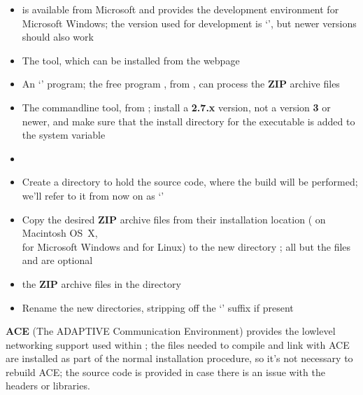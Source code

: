 \begin{itemize}
\item{} is available from Microsoft and provides the 
development environment for Microsoft Windows; the version used for development is
`', but newer versions should also work
\item\exSp{}The  tool, which can be installed from the web\longDash{}page
\item\exSp{}An `' program; the free program , from
, can process the \textbf{ZIP} archive files
\item\exSp{}The  command\longDash{}line tool, from
; install a \textbf{2.7.x}
version, not a version \textbf{3} or newer, and make sure that the install directory for
the executable is added to the system  variable
\end{itemize}
\tertiaryEnd
{}
\begin{itemize}
\item\TBD
\end{itemize}
\tertiaryEnd
\secondaryEnd
{}
\begin{itemize}
\item Create a directory to hold the source code, where the build will be performed; we'll
refer to it from now on as `'
\item\exSp{}Copy the desired \textbf{ZIP} archive files from their installation location
( on Macintosh OS~X,\\
 for
Microsoft Windows and \TBD{} for Linux) to the new directory ; all
but the files  and
are optional
\item\exSp{} the \textbf{ZIP} archive files in the directory
\item\exSp{}Rename the new directories, stripping off the `' suffix if
present
\end{itemize}
\secondaryEnd
{}
\textbf{ACE} (The ADAPTIVE Communication Environment) provides the low\longDash{}level
networking support used within \mplusm{}; the files needed to compile and link with ACE
are installed as part of the normal \mplusm{} installation procedure, so it's not
necessary to rebuild ACE; the source code is provided in case there is an issue with the
headers or libraries.\\

